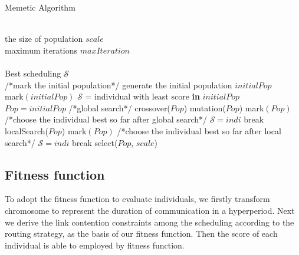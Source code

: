 \documentclass[journal]{IEEEtran}
\newcommand{\calS}{\mathcal{S}}
\begin{document}
\begin{algorithm}[tb]
	\caption{Memetic Algorithm}
	\renewcommand{\algorithmicrequire}{\textbf{Input:}}
	\renewcommand{\algorithmicensure}{\textbf{Output:}}
	\begin{algorithmic}[1]
		\REQUIRE~~\\
		the size of population $scale$\\
		maximum iterations $maxIteration$\\
		\ENSURE~~\\
		Best scheduling $\calS$\\
			\STATE /*mark the initial population*/
				\STATE generate the	initial population $initialPop$\\
				\STATE mark$(initialPop)$
				\STATE $\mathcal{S}$ = individual with least score \textbf{in} $initialPop$
				\STATE $Pop = initialPop$
			\ELSE
			\STATE /*global search*/
				\STATE crossover($Pop$)
				\STATE mutation($Pop$)
				\STATE mark$(Pop)$
			\ENDIF
			\STATE /*choose the individual best so far after global search*/
					\STATE $\mathcal{S}=indi$
				\ENDIF
					\STATE break
				\ENDIF
			\ENDFOR	
			\STATE localSearch($Pop$)
			\STATE mark$(Pop)$
			\STATE /*choose the individual best so far after local search*/
					\STATE $\mathcal{S}=indi$
				\ENDIF
					\STATE break
				\ENDIF
			\ENDFOR			
			\STATE select($Pop$, $scale$)
		\ENDFOR
	\end{algorithmic}
\end{algorithm}	

\subsection{Fitness function \label{s:fit}}

To adopt the fitness function to evaluate individuals,
 we firstly transform chromosome to represent the duration of communication in a hyperperiod.
Next we derive the link contention constraints among the scheduling according to the routing strategy,
 as the basis of our fitness function.
Then the score of each individual is able to employed by fitness function.
\end{document}
